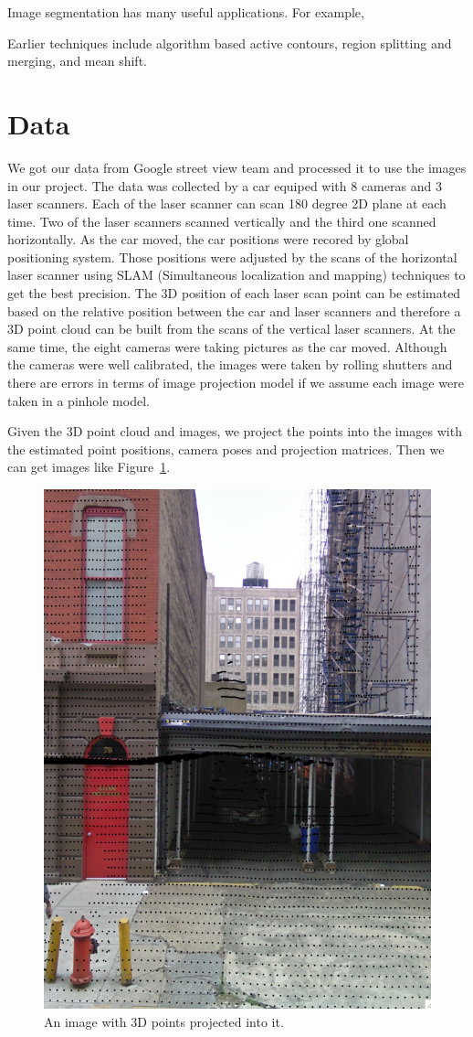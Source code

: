 \documentclass{article} %
\begin{document}
Image segmentation has many useful applications. For example, 

 Earlier techniques include algorithm based active contours, region splitting and merging, and mean shift.



\section{Data}
We got our data from Google street view team and processed it to use
the images in our project. The data was collected by a car equiped
with 8 cameras and 3 laser scanners. Each of the laser scanner can scan 180 degree 2D
plane at each time. Two of the laser scanners scanned vertically and
the third one scanned horizontally. As the car moved, the car
positions were recored by global positioning system. Those positions
were adjusted by the scans of the horizontal laser scanner using SLAM
(Simultaneous localization and mapping) techniques to get the best
precision. The 3D position of each laser scan point can be
estimated based on the relative position between the car and laser
scanners and therefore a 3D point cloud can be built from the scans of
the vertical laser scanners. At the same time, the eight
cameras were taking pictures as the car moved. Although the cameras
were well calibrated, the images were taken by rolling shutters and
there are errors in terms of image projection model if we assume each
image were taken in a pinhole model.

Given the 3D point cloud and images, we project the points into the
images with the estimated point positions, camera poses and projection
matrices. Then we can get images like Figure~\ref{fig-data_image}.

\begin{figure}[h]
\begin{center}
\includegraphics[height=0.5\linewidth]{./fig/image_sample.png}
\end{center}
\caption{An image with 3D points projected into it.}
\label{fig-data_image}
\end{figure}
\end{document}
